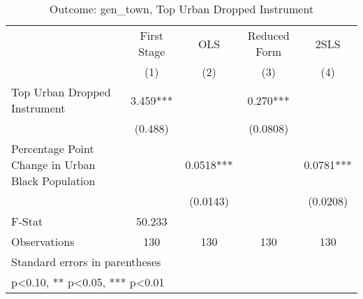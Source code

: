 \begin{table}[htbp]\centering
\def\sym#1{\ifmmode^{#1}\else\(^{#1}\)\fi}
\caption{Outcome: gen\_town, Top Urban Dropped Instrument}
\begin{tabular}{l*{4}{c}}
\toprule
                    & First Stage   &         OLS   &Reduced Form   &        2SLS   \\
                    &\multicolumn{1}{c}{(1)}   &\multicolumn{1}{c}{(2)}   &\multicolumn{1}{c}{(3)}   &\multicolumn{1}{c}{(4)}   \\
\midrule
Top Urban Dropped Instrument&       3.459***&               &       0.270***&               \\
                    &     (0.488)   &               &    (0.0808)   &               \\
\addlinespace
Percentage Point Change in Urban Black Population&               &      0.0518***&               &      0.0781***\\
                    &               &    (0.0143)   &               &    (0.0208)   \\
\midrule
F-Stat              &      50.233   &               &               &               \\
Observations        &         130   &         130   &         130   &         130   \\
\bottomrule
\multicolumn{5}{l}{\footnotesize Standard errors in parentheses}\\
\multicolumn{5}{l}{\footnotesize * p<0.10, ** p<0.05, *** p<0.01}\\
\end{tabular}
\end{table}
